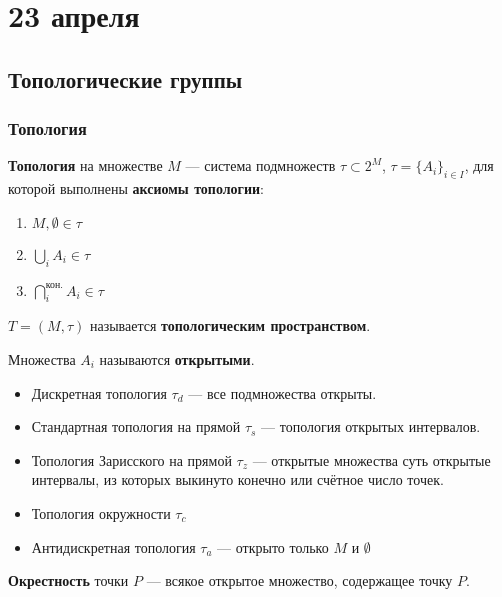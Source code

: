 \chapter{23 апреля}

\section{Топологические группы}

\subsection{Топология}

\begin{definition}
	\textbf{Топология} на множестве \(M\) --- система подмножеств
	\(\tau \subset 2^M\), \(\tau = \{A_i\}_{i \in I}\),
	для которой выполнены \textbf{аксиомы топологии}:
	\begin{enumerate}
		\item \(M, \emptyset \in \tau\)
		\item \(\bigcup_i A_i \in \tau\)
		\item \(\bigcap_i^{\text{кон.}} A_i \in \tau\)
	\end{enumerate}
	\(T = (M, \tau)\) называется \textbf{топологическим пространством}.
\end{definition}

\begin{remark}
	Множества \(A_i\) называются \textbf{открытыми}.
\end{remark}

\begin{example}\itemfix
	\begin{itemize}
		\item Дискретная топология \(\tau_d\) --- все подмножества открыты.
		\item Стандартная топология на прямой \(\tau_s\) --- топология открытых интервалов.
		\item Топология Зарисского на прямой \(\tau_z\) --- открытые множества суть
		      открытые интервалы, из которых выкинуто конечно или счётное число точек.
		\item Топология окружности \(\tau_c\)
		\item Антидискретная топология \(\tau_a\) --- открыто только \(M\) и  \(\emptyset\)
	\end{itemize}
\end{example}

\begin{definition}
	\textbf{Окрестность} точки \(P\) --- всякое открытое множество, содержащее точку \(P\).
\end{definition}

